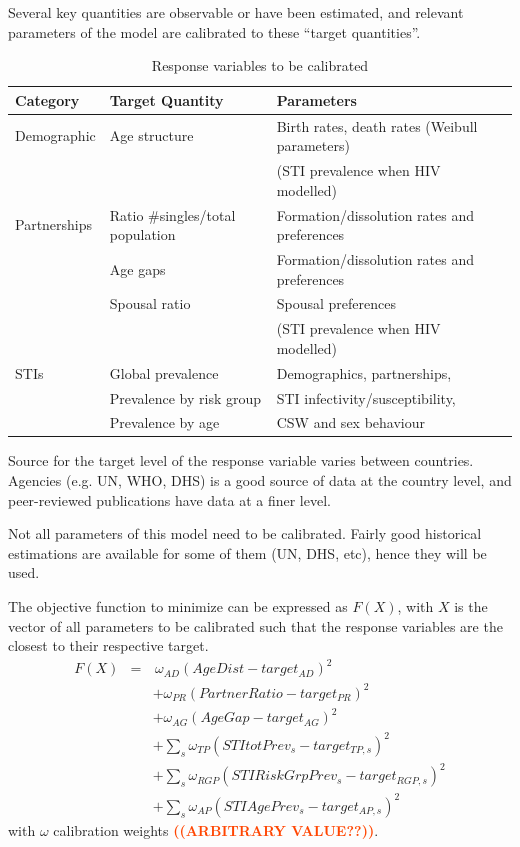 \documentclass[11pt, onecolumn]{article}
\newcommand{\warning}[1]{\textbf{\textcolor{OrangeRed}{#1}}}
\begin{document}
Several key quantities are observable or have been estimated, and relevant parameters of the model are calibrated to these ``target quantities''.
\begin{table}[htdp]
\caption{Response variables to be calibrated}
\begin{center}
\begin{tabular}{lll}

\hline
\textbf{Category} & \textbf{Target Quantity} & \textbf{Parameters} \\

\hline
Demographic  &  Age structure & Birth rates, death rates (Weibull parameters)\\
 & & (STI prevalence when HIV modelled)\\
\hline
Partnerships  &  Ratio \#singles/total population  &  Formation/dissolution rates and preferences \\
  &  Age gaps &   Formation/dissolution rates and preferences  \\
  &  Spousal ratio & Spousal preferences \\
 & & (STI prevalence when HIV modelled)\\
\hline
STIs	& Global prevalence & Demographics, partnerships,\\
	& Prevalence by risk group & STI infectivity/susceptibility,\\
	& Prevalence by age & CSW and sex behaviour\\
\hline
\end{tabular}
\end{center}
\label{default}
\end{table}


Source for the target level of the response variable varies between countries. Agencies (e.g. UN, WHO, DHS) is a good source of data at the  country level, and peer-reviewed publications have data at a finer level.

Not all parameters of this model need to be calibrated. Fairly good historical estimations are available for some of them (UN, DHS, etc), hence they will be used. 

The objective function to minimize can be expressed as $F(X)$, with $X$ is the vector of all parameters to be calibrated such that the response variables are the closest to their respective target.
\begin{eqnarray*}
F(X) & =&\,\omega_{AD}(AgeDist - target_{AD})^2 \\
& & + \omega_{PR}(PartnerRatio - target_{PR})^2 \\
& & + \omega_{AG}(AgeGap - target_{AG})^2 \\
& & +\sum_s \omega_{TP}(STItotPrev_s-target_{TP,s})^2 \\
& & +\sum_s \omega_{RGP}(STIRiskGrpPrev_s-target_{RGP,s})^2\\
& & +\sum_s \omega_{AP}(STIAgePrev_s-target_{AP,s})^2
\end{eqnarray*}
with $\omega$ calibration weights \warning{((ARBITRARY VALUE??))}. 
\end{document}
